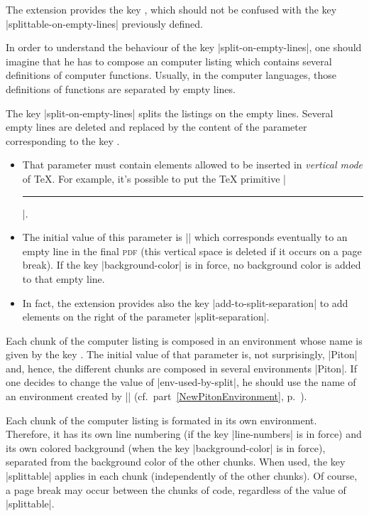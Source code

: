 \documentclass{article}
\begin{document}
\label{split-on-empty-lines}

The extension  provides the key ,
which should not be confused with the key |splittable-on-empty-lines|
previously defined.

\smallskip
In order to understand the behaviour of the key |split-on-empty-lines|, one
should imagine that he has to compose an computer listing which contains
several definitions of computer functions. Usually, in the computer
languages, those definitions of functions are separated by empty lines.

\smallskip
The key |split-on-empty-lines| splits the listings on the empty lines. Several
empty lines are deleted and replaced by the content of the parameter
corresponding to the key .
\begin{itemize}
\item That parameter must contain elements allowed to be inserted in
\emph{vertical mode} of TeX. For example, it's possible to put the TeX
primitive |\hrule|.

\item The initial value of this parameter is
|\vspace{\baselineskip}\vspace{-1.25pt}| which corresponds eventually to an 
empty line in the final \textsc{pdf} (this vertical space is deleted if it
occurs on a page break). If the key |background-color| is in force, no
background color is added to that empty line.

\item In fact, the extension  provides also the key
|add-to-split-separation| to add elements on the right of the parameter
|split-separation|.
\end{itemize}


Each chunk of the computer listing is composed in an environment whose name
is given by the key . The initial value of that
parameter is, not surprisingly, |Piton| and, hence, the different chunks are
composed in several environments |{Piton}|. If one decides to change the value
of |env-used-by-split|, he should use the name of an environment created by
|\NewPitonEnvironment| (cf.~part~\ref{NewPitonEnvironment},
p.~\pageref{NewPitonEnvironment}).

Each chunk of the computer listing is formated in its own environment.
Therefore, it has its own line numbering (if the key
|line-numbers| is in force) and its own colored background (when the key
|background-color| is in force), separated from the background color of the
other chunks. When used, the key |splittable| applies in each chunk
(independently of the other chunks). Of course, a page break may occur between
the chunks of code, regardless of the value of |splittable|.
\end{document}
